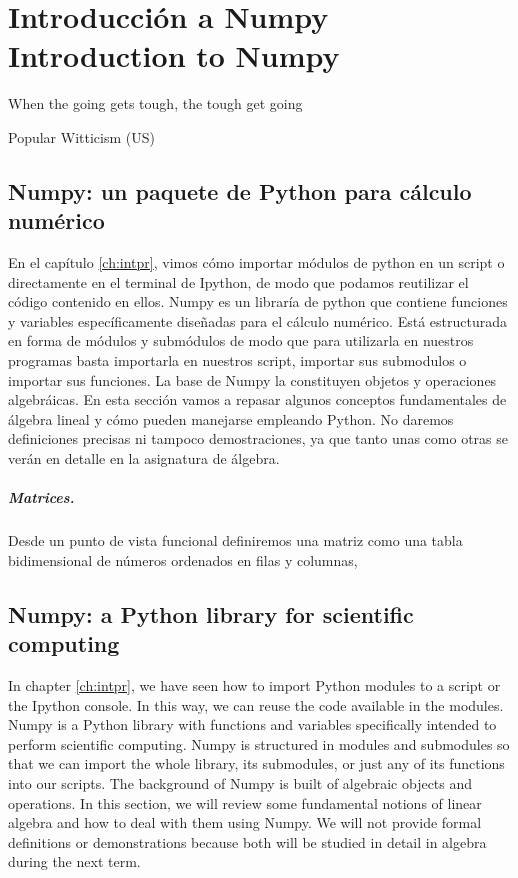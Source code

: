 \chapter{Introducción a Numpy\\ Introduction to Numpy} \label{ch:numpy}
\epigraph{When the going gets tough, the tough get going}{Popular Witticism (US)}
\begin{paracol}{2}
\section{Numpy: un paquete de Python para cálculo nu\-mérico}
En el capítulo \ref{ch:intpr}, vimos cómo importar mó\-dulos de python en un script o directamente en el terminal de Ipython, de modo que podamos reutilizar el código contenido en ellos. Numpy es un libraría de python que contiene funciones y variables específicamente diseñadas para el cálculo numérico. Está estructurada en forma de módulos y submódulos de modo que para utilizarla en nuestros programas basta  importarla en nuestros script, importar sus submodulos o importar sus funciones.
La base de Numpy la constituyen objetos y operaciones algebráicas. En esta sección vamos a repasar algunos conceptos fundamentales de  álgebra lineal y cómo pueden manejarse empleando Python. No daremos definiciones precisas ni tampoco demostraciones, ya que tanto unas como otras se verán en detalle en la asignatura de álgebra.

\paragraph{Matrices.} Desde un punto de vista funcional definiremos una matriz como una tabla bidimensional de números ordenados en filas y columnas,
\switchcolumn

\section{Numpy: a Python library for scientific computing}

In chapter \ref{ch:intpr}, we have seen how to import Python modules to a script or the Ipython console. In this way, we can reuse the code available in the modules. Numpy is a Python library with functions and variables specifically intended to perform scientific computing. Numpy is structured in modules and submodules so that we can import the whole library, its submodules, or just any of its functions into our scripts. The background of Numpy is built of algebraic objects and operations. In this section, we will review some fundamental notions of linear algebra and how to deal with them using Numpy. We will not provide formal definitions or demonstrations because both will be studied in detail in algebra during the next term.

\end{paracol}
